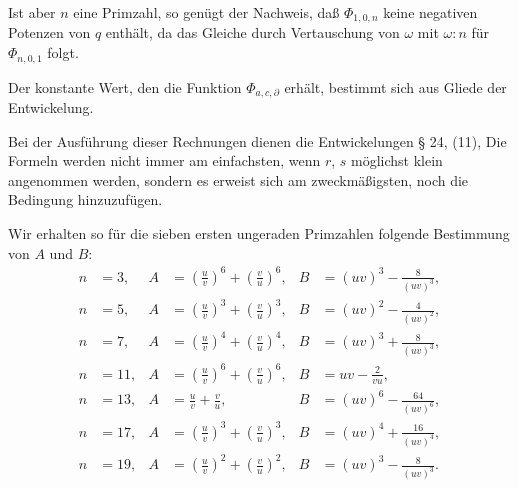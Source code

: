 Ist aber $n$ eine Primzahl, so genügt der Nachweis, daß $\Phi_{1,0,n}$
keine negativen Potenzen von $q$ enthält, da das Gleiche durch
Vertauschung von $\omega$ mit $\omega:n$ für $\Phi_{n,0,1}$ folgt.

Der konstante Wert, den die Funktion $\Phi_{a,c,\partial}$ erhält, bestimmt
sich aus  Gliede der Entwickelung.

Bei der Ausführung dieser Rechnungen dienen die Entwickelungen § 24, (11),
Die Formeln werden nicht immer am einfachsten, wenn $r$, $s$
möglichst klein angenommen werden, sondern es erweist sich am
zweckmäßigsten, noch die Bedingung
hinzuzufügen.

Wir erhalten so für die sieben ersten ungeraden Primzahlen
folgende Bestimmung von $A$ und $B$:
\[
\begin{aligned}
n &= 3, & A &= \left(\frac{u}{v}\right)^6 + \left(\frac{v}{u}\right)^6, & B &= (uv)^3 - \frac{8}{(uv)^3}, \\
n &= 5, & A &= \left(\frac{u}{v}\right)^3 + \left(\frac{v}{u}\right)^3, & B &= (uv)^2 - \frac{4}{(uv)^2}, \\
n &= 7, & A &= \left(\frac{u}{v}\right)^4 + \left(\frac{v}{u}\right)^4, & B &= (uv)^3 + \frac{8}{(uv)^3}, \\
n &= 11, & A &= \left(\frac{u}{v}\right)^6 + \left(\frac{v}{u}\right)^6, & B &= uv - \frac{2}{vu}, \\
n &= 13, & A &= \frac{u}{v} + \frac{v}{u}, & B &= (uv)^6 - \frac{64}{(uv)^6}, \\
n &= 17, & A &= \left(\frac{u}{v}\right)^3 + \left(\frac{v}{u}\right)^3, & B &= (uv)^4 + \frac{16}{(uv)^4}, \\
n &= 19, & A &= \left(\frac{u}{v}\right)^2 + \left(\frac{v}{u}\right)^2, & B &= (uv)^3 - \frac{8}{(uv)^3}.
\end{aligned}
\]
